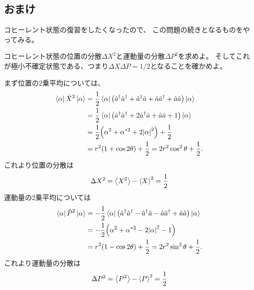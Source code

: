 \documentclass[../../master.tex]{subfiles}
\begin{document}
\subsection{おまけ}
コヒーレント状態の復習をしたくなったので、
この問題の続きとなるものをやってみる。
\newline
\begin{tcolorbox}[colbacktitle=white, coltitle=black, colback=white, title=おまけ1]
    コヒーレント状態の位置の分散\(\Delta X^2\)と運動量の分散\(\Delta P^2\)を求めよ。
    そしてこれが極小不確定状態である、つまり\(\Delta X \Delta P = 1/2\)となることを確かめよ。
\end{tcolorbox}
まず位置の2乗平均については、
\begin{equation}\begin{aligned}[b]
    \bra{\alpha}\hat{X}^2\ket{\alpha}
    &= \frac{1}{2}\bra{\alpha}\qty(
        \hat{a}^\dagger\hat{a}^\dagger+\hat{a}^\dagger\hat{a}+\hat{a}\hat{a}^\dagger+\hat{a}\hat{a})\ket{\alpha}\\
    &= \frac{1}{2}\bra{\alpha}\qty(
        \hat{a}^\dagger\hat{a}^\dagger+2\hat{a}^\dagger\hat{a}+\hat{a}\hat{a}+1)\ket{\alpha}\\
    &= \frac{1}{2}\qty(\alpha^2+\alpha^{*2}+2\abs{\alpha}^2)+\frac{1}{2}\\
    &= r^2(1+\cos2\theta)+\frac{1}{2} = 2r^2\cos^2\theta+\frac{1}{2}.
\end{aligned}\end{equation}
これより位置の分散は
\begin{align*}
    \Delta X^2 = \ev{X^2}-\ev{X}^2 = \frac{1}{2}
\end{align*}
運動量の2乗平均については
\begin{equation}\begin{aligned}[b]
    \bra{\alpha}\hat{P}^2\ket{\alpha}
    &= -\frac{1}{2}\bra{\alpha}\qty(
        \hat{a}^\dagger\hat{a}^\dagger-\hat{a}^\dagger\hat{a}-\hat{a}\hat{a}^\dagger+\hat{a}\hat{a})\ket{\alpha}\\
    &= -\frac{1}{2}\qty(\alpha^2+\alpha^{*2}-2\abs{\alpha}^2-1)\\
    &= r^2(1-\cos2\theta) +\frac{1}{2}= 2r^2\sin^2\theta + \frac{1}{2}.
\end{aligned}\end{equation}
これより運動量の分散は
\begin{equation}\begin{aligned}[b]
    \Delta P^2 = \ev{P^2}-\ev{P}^2 = \frac{1}{2}
\end{aligned}\end{equation}
\end{document}
